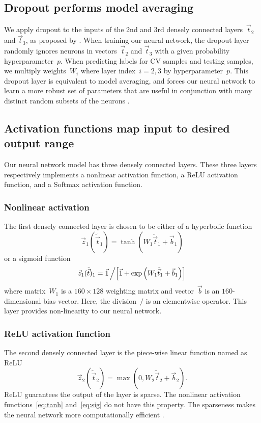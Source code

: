\subsection{Dropout performs model averaging}
We apply dropout to the inputs of the 2nd and 3rd densely connected layers~$\vec t_2$ and $\vec t_3$, as proposed by \citet{dropout}. 
When training our neural network, the dropout layer randomly ignores neurons in vectors~$\vec t_2$ and $\vec t_3$ with a given probability hyperparameter~$p$. 
When predicting labels for CV samples and testing samples, we multiply weights~$W_i$ where layer index~$i=2,3$ by hyperparameter~$p$. This dropout layer is equivalent to model averaging, and forces our neural network to learn a more robust set of parameters that are useful in conjunction with many distinct random subsets of the neurons \citep{DBLP:journals/corr/abs-1207-0580}.

\subsection{Activation functions map input to desired output range}
Our neural network model has three densely connected layers. These three layers respectively implements a nonlinear activation function, a ReLU activation function, and a Softmax activation function.
\subsubsection{Nonlinear activation\label{sec:nonl}}
The first densely connected layer is chosen to be either of a hyperbolic function 
\begin{equation}
 \vec z_1(\tilde{\vec  t}_1)=\tanh(W_1\tilde{\vec  t}_1+\vec b_1) \label{eq:tanh}
\end{equation}
or a sigmoid function 
\begin{equation}
  \vec z_1 (\tilde{\vec  t})_1 =  {\vec 1}\left/\left[\vec 1 + \exp\left(W_1\tilde{\vec  t}_1+\vec b_1 \right)\right]\right.  \label{eq:sig}
\end{equation}
where matrix~$W_1$ is a $160\times128$ weighting matrix and vector~$\vec b$ is an $160$-dimensional bias vector. 
Here, the division~$/$ is an elementwise operator.
This layer provides non-linearity to our neural network.
\subsubsection{ReLU activation function}
The second densely connected layer is the piece-wise linear function named as ReLU
\begin{equation*}
   \vec z_2(\tilde{\vec  t}_2)=\max(0,W_2\tilde{\vec  t}_2+\vec b_2).
\end{equation*} 
ReLU guarantees the output of the layer is sparse. The nonlinear activation functions~\eqref{eq:tanh} and~\eqref{eq:sig} do not have this property. 
The sparseness makes the neural network more computationally efficient \citep{NIPS20145267}.
